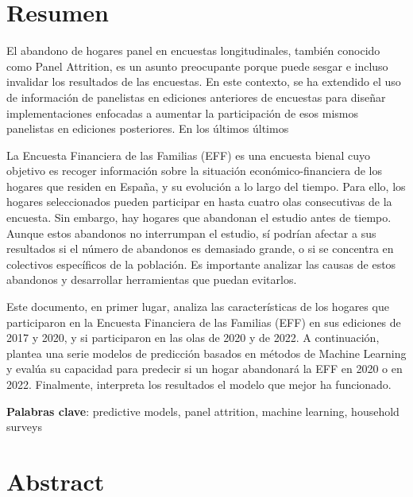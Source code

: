 
\chapter*{Resumen}

\onehalfspacing

El abandono de hogares panel en encuestas longitudinales, también conocido como Panel Attrition, es un asunto preocupante porque puede sesgar e incluso invalidar los resultados de las encuestas. En este contexto, se ha extendido el uso de información de panelistas en ediciones anteriores de encuestas para diseñar implementaciones enfocadas a aumentar la participación de esos mismos panelistas en ediciones posteriores. En los últimos últimos 


La Encuesta Financiera de las Familias (EFF) es una encuesta bienal cuyo objetivo es recoger información sobre la situación económico-financiera de los hogares que residen en España, y su evolución a lo largo del tiempo. Para ello, los hogares seleccionados pueden participar en hasta cuatro olas consecutivas de la encuesta. Sin embargo, hay hogares que abandonan el estudio antes de tiempo. Aunque estos abandonos no interrumpan el estudio, sí podrían afectar a sus resultados si el número de abandonos es demasiado grande, o si se concentra en colectivos específicos de la población. Es importante analizar las causas de estos abandonos y desarrollar herramientas que puedan evitarlos.

Este documento, en primer lugar, analiza las características de los hogares que participaron en la Encuesta Financiera de las Familias (EFF) en sus ediciones de 2017 y 2020, y si participaron en las olas de 2020 y de 2022. A continuación, plantea una serie modelos de predicción basados en métodos de Machine Learning y evalúa su capacidad para predecir si un hogar abandonará la EFF en 2020 o en 2022. Finalmente, interpreta los resultados el modelo que mejor ha funcionado.

\vspace{1.5cm}

\textbf{Palabras clave}: predictive models, panel attrition, machine learning, household surveys

\chapter*{Abstract}


